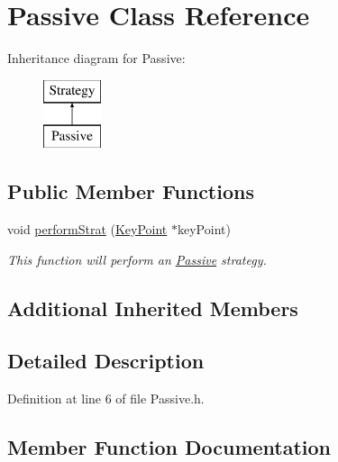 \hypertarget{classPassive}{}\section{Passive Class Reference}
\label{classPassive}
Inheritance diagram for Passive\+:\begin{figure}[H]
\begin{center}
\leavevmode
\includegraphics[height=2.000000cm]{classPassive}
\end{center}
\end{figure}
\subsection*{Public Member Functions}
\begin{DoxyCompactItemize}
\item 
void \hyperlink{classPassive_a3aaac6b29f827a1a5260094db1eb4c68}{perform\+Strat} (\hyperlink{classKeyPoint}{Key\+Point} $\ast$key\+Point)
\begin{DoxyCompactList}\small\item\em This function will perform an \hyperlink{classPassive}{Passive} strategy. \end{DoxyCompactList}\end{DoxyCompactItemize}
\subsection*{Additional Inherited Members}


\subsection{Detailed Description}


Definition at line 6 of file Passive.\+h.



\subsection{Member Function Documentation}
\mbox{\label{classPassive_a3aaac6b29f827a1a5260094db1eb4c68}} 
